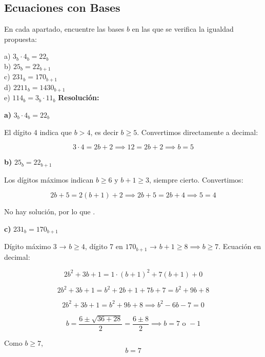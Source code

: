 \documentclass[a4paper,12pt]{article}
\begin{document}
\subsection{Ecuaciones con Bases}

\begin{ejercicio}[title=Ejercicio 3]
En cada apartado, encuentre las bases $b$ en las que se verifica la igualdad propuesta:

a) $3_b \cdot 4_b = 22_b$ \\
b) $25_b = 22_{b+1}$ \\
c) $231_b = 170_{b+1}$ \\
d) $2211_b = 1430_{b+1}$ \\
e) $114_b = 3_b \cdot 11_b$
\tcblower
\textbf{Resolución:}

\textbf{a) } $3_b \cdot 4_b = 22_b$  

\vspace{0.5em}

El dígito 4 indica que $b > 4$, es decir $b \ge 5$.  
Convertimos directamente a decimal:

\[
3 \cdot 4 = 2b + 2 \implies 12 = 2b + 2 \implies \boxed{b = 5}
\]

\vspace{0.5em}

\textbf{b) } $25_b = 22_{b+1}$  

\vspace{0.5em}

Los dígitos máximos indican $b \ge 6$ y $b+1 \ge 3$, siempre cierto.  
Convertimos:

\[
2b + 5 = 2(b+1) + 2 \implies 2b + 5 = 2b + 4 \implies 5 = 4
\]

No hay solución, por lo que .

\vspace{0.5em}

\textbf{c) } $231_b = 170_{b+1}$  

\vspace{0.5em}

Dígito máximo 3 → $b \ge 4$, dígito 7 en $170_{b+1}$ → $b+1 \ge 8 \implies b \ge 7$.  
Ecuación en decimal:

\[
2b^2 + 3b + 1 = 1\cdot(b+1)^2 + 7(b+1) + 0
\]

\[
2b^2 + 3b + 1 = b^2 + 2b + 1 + 7b + 7 = b^2 + 9b + 8
\]

\[
2b^2 + 3b + 1 = b^2 + 9b + 8 \implies b^2 - 6b - 7 = 0
\]

\[
b = \frac{6 \pm \sqrt{36 + 28}}{2} = \frac{6 \pm 8}{2} \implies b = 7 \text{ o } -1
\]

Como $b \ge 7$, \[
\boxed{b = 7}
\]

\end{ejercicio}
\end{document}
